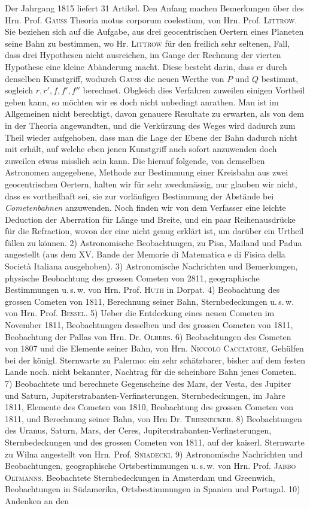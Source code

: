 Der Jahrgang 1815 liefert 31 Artikel. Den Anfang machen Bemerkungen über des Hrn. Prof. \textsc{Gauss} Theoria motus corporum coelestium, von Hrn. Prof. \textsc{Littrow}. Sie beziehen sich auf die Aufgabe, aus drei geocentrischen Oertern eines Planeten seine Bahn zu bestimmen, wo Hr. \textsc{Littrow} für den freilich sehr seltenen, Fall, dass drei Hypothesen nicht ausreichen, im Gange der Rechnung der vierten Hypothese eine kleine Abänderung macht. Diese besteht darin, dass er durch denselben Kunstgriff, wodurch \textsc{Gauss} die neuen Werthe von $P$ und $Q$ bestimmt, sogleich $r, r', f, f', f''$ berechnet. Obgleich dies Verfahren zuweilen einigen Vortheil geben kann, so möchten wir es doch nicht unbedingt anrathen. Man ist im Allgemeinen nicht berechtigt, davon genauere Resultate zu erwarten, als von dem in der Theoria angewandten, und die Verkürzung des Weges wird dadurch zum Theil wieder aufgehoben, dass man die Lage der Ebene der Bahn dadurch nicht mit erhält, auf welche eben jenen Kunstgriff auch sofort anzuwenden doch zuweilen etwas misslich sein kann. Die hierauf folgende, von demselben Astronomen angegebene, Methode zur Bestimmung einer Kreisbahn aus zwei geocentrischen Oertern, halten wir für sehr zweckmässig, nur glauben wir nicht, dass es vortheilhaft sei, sie zur vorläufigen Bestimmung der Abstände bei \emph{Cometenbahnen} anzuwenden. Noch finden wir von dem Verfasser eine leichte Deduction der Aberration für Länge und Breite, und ein paar Reihenausdrücke für die Refraction, wovon der eine nicht genug erklärt ist, um darüber ein Urtheil fällen zu können. 2) Astronomische Beobachtungen, zu Pisa, Mailand und Padua angestellt (aus dem XV. Bande der Memorie di Matematica e di Fisica della Società Italiana ausgehoben). 3) Astronomische Nachrichten und Bemerkungen, physische Beobachtung des grossen Cometen von 2811, geographische Bestimmungen u.\,s.\,w. von Hrn. Prof. \textsc{Huth} in Dorpat. 4) Beobachtung des grossen Cometen von 1811, Berechnung seiner Bahn, Sternbedeckungen u.\,s.\,w. von Hrn. Prof. \textsc{Bessel}. 5) Ueber die Entdeckung eines neuen Cometen im November 1811, Beobachtungen desselben und des grossen Cometen von 1811, Beobachtung der Pallas von Hrn. Dr. \textsc{Olbers}. 6) Beobachtungen des Cometen von 1807 und die Elemente seiner Bahn, von Hrn. \textsc{Niccolo Cacciatore}, Gehülfen bei der königl. Sternwarte zu Palermo: ein sehr schätzbarer, bisher auf dem festen Lande noch. nicht bekannter, Nachtrag für die scheinbare Bahn jenes Cometen. 7) Beobachtete und berechnete Gegenscheine des Mars, der Vesta, des Jupiter und Saturn, Jupiterstrabanten-Verfinsterungen, Sternbedeckungen, im Jahre 1811, Elemente des Cometen von 1810, Beobachtung des grossen Cometen von 1811, und Berechnung seiner Bahn, von Hrn Dr. \textsc{Triesnecker}. 8) Beobachtungen des Uranus, Saturn, Mars, der Ceres, Jupiterstrabanten-Verfinsterungen, Sternbedeckungen und des grossen Cometen von 1811, auf der kaiserl. Sternwarte zu Wilna angestellt von Hrn. Prof. \textsc{Sniadecki}. 9) Astronomische Nachrichten und Beobachtungen, geographische Ortsbestimmungen u.\,s.\,w. von Hrn. Prof. \textsc{Jabbo Oltmanns}. Beobachtete Sternbedeckungen in Amsterdam und Greenwich, Beobachtungen in Südamerika, Ortsbestimmungen in Spanien und Portugal. 10) Andenken an den 